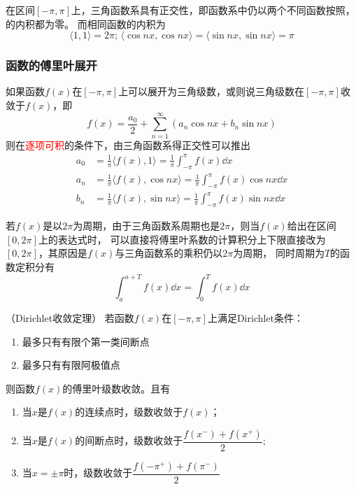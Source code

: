 在区间$[-\pi,\pi]$上，三角函数系具有正交性，即函数系中仍以两个不同函数按照，的内积都为零。
而相同函数的内积为
\[
    \langle 1,1 \rangle = 2\pi;\,
    \langle \cos nx, \cos nx \rangle
    =
    \langle \sin nx, \sin nx\rangle
    =
    \pi
\]

\subsubsection{函数的傅里叶展开}
如果函数$f(x)$在$[-\pi,\pi]$上可以展开为三角级数，或则说三角级数在$[-\pi,\pi]$收敛于$f(x)$，即
\begin{equation}
    f(x) = \frac{a_0}{2} + \sum_{n=1}^\infty (a_n\cos nx + b_n \sin nx)
\end{equation}
则在\textcolor{red}{逐项可积}的条件下，由三角函数系得正交性可以推出
\begin{align}
    a_0 & = \frac{1}{\pi}\langle f(x),1 \rangle        = \frac{1}{\pi}\int_{-\pi}^{\pi} f(x)\dd{x}        \\
    a_n & = \frac{1}{\pi}\langle f(x),\cos nx \rangle  = \frac{1}{\pi}\int_{-\pi}^{\pi} f(x)\cos nx\dd{x} \\
    b_n & = \frac{1}{\pi}\langle f(x),\sin nx \rangle  = \frac{1}{\pi}\int_{-\pi}^{\pi} f(x)\sin nx\dd{x}
\end{align}

若$f(x)$是以$2\pi$为周期，由于三角函数系周期也是$2\pi$，则当$f(x)$给出在区间$[0,2\pi]$上的表达式时，
可以直接将傅里叶系数的计算积分上下限直接改为$[0,2\pi]$，其原因是$f(x)$与三角函数系的乘积仍以$2\pi$为周期，
同时周期为$T$的函数定积分有
\[ \int_a^{a+T} f(x)\dd{x} = \int_0^T f(x)\dd{x} \]

\begin{theorem}
    （Dirichlet收敛定理）
    \label{th:Dirichlet收敛定理}
    若函数$f(x)$在$[-\pi,\pi]$上满足Dirichlet条件：
    \begin{enumerate}[(1)]
        \item 最多只有有限个第一类间断点
        \item 最多只有有限阿极值点
    \end{enumerate}
    则函数$f(x)$的傅里叶级数收敛。且有
    \begin{enumerate}[(1)]
        \item 当$x$是$f(x)$的连续点时，级数收敛于$f(x)$；
        \item 当$x$是$f(x)$的间断点时，级数收敛于$\dfrac{f(x^-)+f(x^+)}{2}$;
        \item 当$x=\pm\pi$时，级数收敛于$\dfrac{f(-\pi^+)+f(\pi^-)}{2}$
    \end{enumerate}
\end{theorem}

